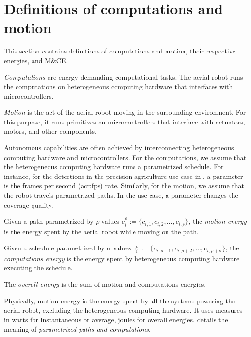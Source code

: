 \section{Definitions of computations and motion}
\label{sec:definitions}

This section contains definitions of computations and motion, their respective energies, and M\&CE.

\begin{defn}
  \label{def:comps}
  \emph{Computations} are energy-demanding computational tasks. The aerial robot runs the computations on heterogeneous computing hardware that interfaces with microcontrollers.
  
  \emph{Motion} is the act of the aerial robot moving in the surrounding environment. For this purpose, it runs primitives on microcontrollers that interface with actuators, motors, and other components.
\end{defn}

Autonomous capabilities are often achieved by interconnecting heterogeneous computing hardware and microcontrollers. For the computations, we assume that the heterogeneous computing hardware runs a parametrized schedule. For instance, for the detections in the precision agriculture use case in , a parameter is the frames per second (\Gls{acr:fps}) rate. Similarly, for the motion, we assume that the robot travels parametrized paths. In the use case, a parameter changes the coverage quality.

\begin{defn}
  \label{def:comp-mot-energy}
  Given a path parametrized by $\rho$ values $c_i^\rho:=\{c_{i,1},c_{i,2},\dots,c_{i,\rho}\}$, the \emph{motion energy} is the energy spent by the aerial robot while moving on the path.

  Given a schedule parametrized by $\sigma$ values $c_i^\sigma:=\{c_{i,\rho+1},c_{i,\rho+2},\dots,c_{i,\rho+\sigma}\}$, the \emph{computations energy} is the energy spent by heterogeneous computing hardware executing the schedule.
  
  The \emph{overall energy} is the sum of motion and computations energies.
\end{defn}

Physically, motion energy is the energy spent by all the systems powering the aerial robot, excluding the heterogeneous computing hardware. It uses measures in watts for instantaneous or average, joules for overall energies.  details the meaning of {\itshape parametrized paths and computations}.


